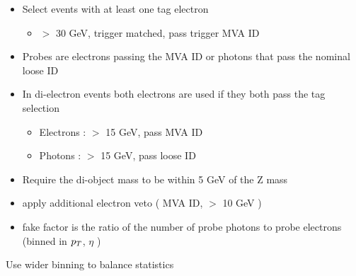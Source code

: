 \documentclass{beamer}
\begin{document}
 {

    \begin{itemize}     
        \item Select events with at least one tag electron
        \begin{itemize}
            \item \pt $>$ 30 GeV, trigger matched, pass trigger MVA ID
        \end{itemize}
        \item Probes are electrons passing the MVA ID or photons that pass the nominal loose ID
        \item In di-electron events both electrons are used if they both pass the tag selection
        \begin{itemize}
            \item Electrons : \pt $>$ 15 GeV, pass MVA ID
            \item Photons : \pt $>$ 15 GeV, pass loose ID
        \end{itemize}
        \item Require the di-object mass to be within 5 GeV of the Z mass
        \item apply additional electron veto ( MVA ID, \pt $>$ 10 GeV )
        \item fake factor is the ratio of the number of probe photons to probe electrons (binned in $p_{T}$, $\eta$ )
    \end{itemize}
        

}

 {

}

 {

}

 {


}

 {


}

 {

    Use wider binning to balance statistics 

}

 {

}

 {

}



 {

}
\end{document}
